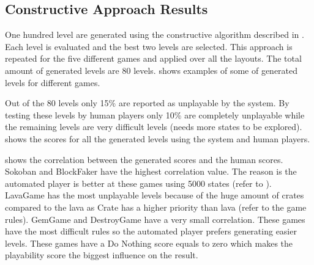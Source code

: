 
\subsection{Constructive Approach Results}
One hundred level are generated using the constructive algorithm described in . Each level is evaluated and the best two levels are selected. This approach is repeated for the five different games and applied over all the layouts. The total amount of generated levels are 80 levels.  shows examples of some of generated levels for different games.\\\par


Out of the 80 levels only 15\% are reported as unplayable by the system. By testing these levels by human players only 10\% are completely unplayable while the remaining levels are very difficult levels (needs more states to be explored).  shows the scores for all the generated levels using the system and human players.\\\par

 shows the correlation between the generated scores and the human scores. Sokoban and BlockFaker have the highest correlation value. The reason is the automated player is better at these games using 5000 states (refer to ). LavaGame has the most unplayable levels because of the huge amount of crates compared to the lava as Crate has a higher priority than lava (refer to the game rules). GemGame and DestroyGame have a very small correlation. These games have the most difficult rules so the automated player prefers generating easier levels. These games have a Do Nothing score equals to zero which makes the playability score the biggest influence on the result.


